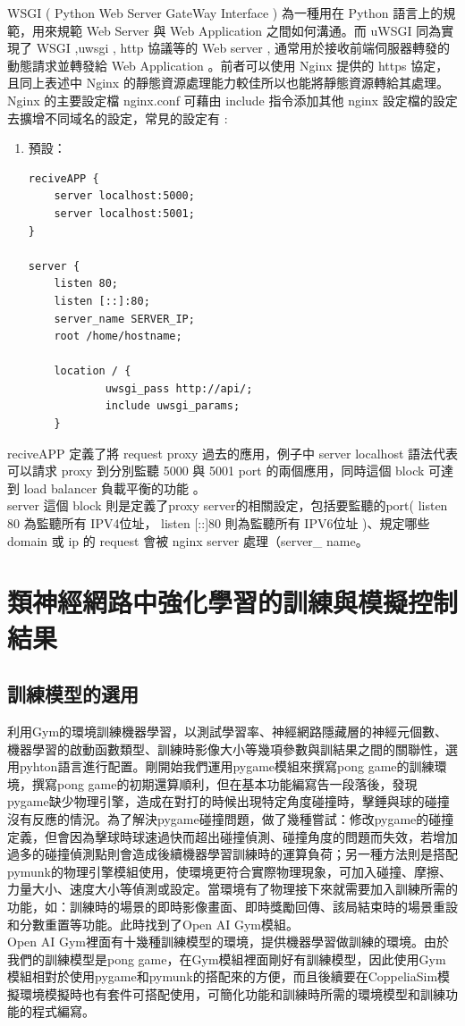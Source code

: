 \documentclass[14pt,a4paper]{report}  %
\begin{document}
 WSGI ( Python Web Server GateWay Interface ) 為一種用在 Python 語言上的規範，用來規範 Web Server 與 Web Application 之間如何溝通。而 uWSGI 同為實現了 WSGI ,uwsgi , http 協議等的 Web server , 通常用於接收前端伺服器轉發的動態請求並轉發給 Web Application 。前者可以使用 Nginx 提供的 https 協定，且同上表述中 Nginx 的靜態資源處理能力較佳所以也能將靜態資源轉給其處理。\\
 
Nginx 的主要設定檔 nginx.conf 可藉由 include 指令添加其他 nginx 設定檔的設定去擴增不同域名的設定，常見的設定有 :
\begin{enumerate}
\item 預設：
\begin{lstlisting}[caption=nginx預設]
  reciveAPP {
    server localhost:5000;
    server localhost:5001;
}

server {
    listen 80;
    listen [::]:80;
    server_name SERVER_IP;
    root /home/hostname;

    location / {
            uwsgi_pass http://api/;
            include uwsgi_params;
    }
\end{lstlisting}
\end{enumerate}
 reciveAPP 定義了將 request proxy 過去的應用，例子中 server localhost 語法代表可以請求 proxy 到分別監聽 5000 與 5001 port 的兩個應用，同時這個 block 可達到 load balancer 負載平衡的功能 。\\
 server 這個 block 則是定義了proxy server的相關設定，包括要監聽的port( listen 80 為監聽所有 IPV4位址， listen [::]80 則為監聽所有 IPV6位址 )、規定哪些 domain 或 ip 的 request 會被 nginx server 處理（server\_ name。

\chapter{類神經網路中強化學習的訓練與模擬控制結果}
\section{訓練模型的選用}
 利用Gym的環境訓練機器學習，以測試學習率、神經網路隱藏層的神經元個數、機器學習的啟動函數類型、訓練時影像大小等幾項參數與訓結果之間的關聯性，選用pyhton語言進行配置。剛開始我們運用pygame模組來撰寫pong game的訓練環境，撰寫pong game的初期還算順利，但在基本功能編寫告一段落後，發現pygame缺少物理引擎，造成在對打的時候出現特定角度碰撞時，擊錘與球的碰撞沒有反應的情況。為了解決pygame碰撞問題，做了幾種嘗試：修改pygame的碰撞定義，但會因為擊球時球速過快而超出碰撞偵測、碰撞角度的問題而失效，若增加過多的碰撞偵測點則會造成後續機器學習訓練時的運算負荷；另一種方法則是搭配pymunk的物理引擎模組使用，使環境更符合實際物理現象，可加入碰撞、摩擦、力量大小、速度大小等偵測或設定。當環境有了物理接下來就需要加入訓練所需的功能，如：訓練時的場景的即時影像畫面、即時獎勵回傳、該局結束時的場景重設和分數重置等功能。此時找到了Open AI Gym模組。\\
 Open AI Gym裡面有十幾種訓練模型的環境，提供機器學習做訓練的環境。由於我們的訓練模型是pong game，在Gym模組裡面剛好有訓練模型，因此使用Gym模組相對於使用pygame和pymunk的搭配來的方便，而且後續要在CoppeliaSim模擬環境模擬時也有套件可搭配使用，可簡化功能和訓練時所需的環境模型和訓練功能的程式編寫。\\
\end{document}
